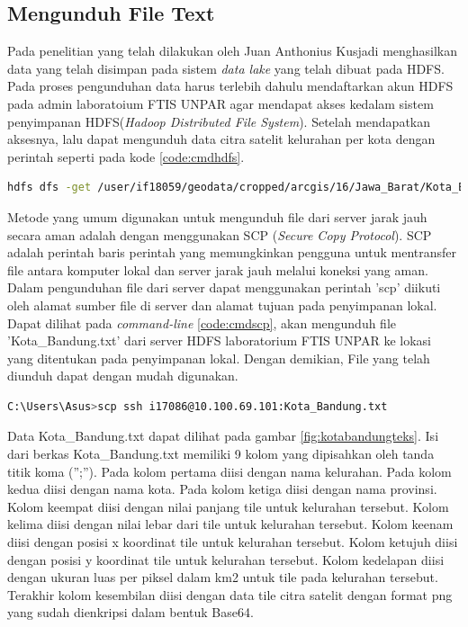 \subsection{Mengunduh File Text}

Pada penelitian yang telah dilakukan oleh Juan Anthonius Kusjadi menghasilkan data yang telah disimpan pada sistem \textit{data lake }yang telah dibuat pada HDFS.\cite{juan:22:pengumpulan} Pada proses pengunduhan data harus terlebih dahulu mendaftarkan akun HDFS pada admin laboratoium FTIS UNPAR agar mendapat akses kedalam sistem penyimpanan HDFS(\textit{Hadoop Distributed File System}). Setelah mendapatkan aksesnya, lalu dapat mengunduh data citra satelit kelurahan per kota dengan perintah seperti pada kode \ref{code:cmdhdfs}. 

\begin{lstlisting}[language=Bash, caption=\textit{Command-line} HDFS,label={code:cmdhdfs}]
	hdfs dfs -get /user/if18059/geodata/cropped/arcgis/16/Jawa_Barat/Kota_Bandung.txt .	
\end{lstlisting}

Metode yang umum digunakan untuk mengunduh file dari server jarak jauh secara aman adalah dengan menggunakan SCP (\textit{Secure Copy Protocol}). SCP adalah perintah baris perintah yang memungkinkan pengguna untuk mentransfer file antara komputer lokal dan server jarak jauh melalui koneksi yang aman. Dalam pengunduhan file dari server dapat menggunakan perintah 'scp' diikuti oleh alamat sumber file di server dan alamat tujuan pada penyimpanan lokal. Dapat dilihat pada \textit{command-line} \ref{code:cmdscp}, akan mengunduh file 'Kota\_Bandung.txt' dari server HDFS laboratorium FTIS UNPAR ke lokasi yang ditentukan pada penyimpanan lokal. Dengan demikian, File yang telah diunduh dapat dengan mudah digunakan.

\begin{lstlisting}[language=Bash, caption=\textit{Command-line} SCP,label={code:cmdscp}]
	C:\Users\Asus>scp ssh i17086@10.100.69.101:Kota_Bandung.txt	
\end{lstlisting}

Data Kota\_Bandung.txt dapat dilihat pada gambar \ref{fig:kotabandungteks}. Isi dari berkas Kota\_Bandung.txt memiliki 9 kolom yang dipisahkan oleh tanda titik koma (”;”). Pada kolom pertama diisi dengan nama kelurahan. Pada kolom kedua diisi dengan nama kota. Pada kolom ketiga diisi dengan nama provinsi. Kolom keempat diisi dengan nilai panjang tile untuk kelurahan tersebut. Kolom kelima diisi dengan nilai lebar dari tile untuk kelurahan tersebut. Kolom keenam diisi dengan posisi x koordinat tile untuk kelurahan tersebut. Kolom ketujuh diisi dengan posisi y koordinat tile untuk kelurahan tersebut. Kolom kedelapan diisi dengan ukuran luas per piksel dalam km2 untuk tile pada kelurahan tersebut. Terakhir kolom kesembilan diisi dengan data
tile citra satelit dengan format png yang sudah dienkripsi dalam bentuk Base64\cite{juan:22:pengumpulan}.
 
